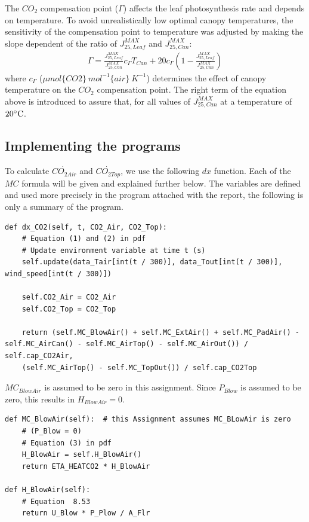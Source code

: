 \documentclass[a4paper]{article}
\numberwithin{equation}{section}
\begin{document}
The \(CO_2\) compensation point (\(\Gamma\)) affects the leaf photosynthesis rate and depends on temperature. To avoid unrealistically low optimal canopy temperatures, the sensitivity of the compensation point to temperature was adjusted by making the slope dependent of the ratio of \(J^{MAX}_{25,Leaf}\) and \(J^{MAX}_{25,Can}\):
\begin{align}
  \Gamma = \frac{J^{MAX}_{25,Leaf}}{J^{MAX}_{25,Can}}c_{\Gamma} T_{Can} + 20 c_{\Gamma} \left(1-\frac{J^{MAX}_{25,Leaf}}{J^{MAX}_{25,Can}}\right)
\end{align}
where \(c_{\Gamma}\) (\(\mu mol\{CO2\}\ mol^{-1}\{air\}\ K^{-1}\)) determines the effect of canopy temperature on the \(CO_2\) compensation point. The right term of the equation above is introduced to assure that, for all values of \(J^{MAX}_{25,Can}\) at a temperature of \(20 \celsius\).

\newpage
\subsection{Implementing the programs}
To calculate \(\dot{CO_{2 Air}}\) and \(\dot{CO_{2 Top}}\), we use the following \(dx\) function. Each of the \(MC\) formula will be given and explained further below. The variables are defined and used more precisely in the program attached with the report, the following is only a summary of the program.

\begin{mdframed}[leftline=false,rightline=false,backgroundcolor=magenta!10,nobreak=true]
  \begin{verbatim}
def dx_CO2(self, t, CO2_Air, CO2_Top):
    # Equation (1) and (2) in pdf
    # Update environment variable at time t (s)
    self.update(data_Tair[int(t / 300)], data_Tout[int(t / 300)], wind_speed[int(t / 300)])

    self.CO2_Air = CO2_Air
    self.CO2_Top = CO2_Top

    return (self.MC_BlowAir() + self.MC_ExtAir() + self.MC_PadAir() - self.MC_AirCan() - self.MC_AirTop() - self.MC_AirOut()) / self.cap_CO2Air, 
    (self.MC_AirTop() - self.MC_TopOut()) / self.cap_CO2Top
  \end{verbatim}
\end{mdframed}

\(MC_{BlowAir}\) is assumed to be zero in this assignment.
Since \(P_{Blow}\) is assumed to be zero, this results in \(H_{BlowAir} = 0\).
\begin{mdframed}[leftline=false,rightline=false,backgroundcolor=magenta!10,nobreak=true]
  \begin{verbatim}
def MC_BlowAir(self):  # this Assignment assumes MC_BLowAir is zero
    # (P_Blow = 0)
    # Equation (3) in pdf
    H_BlowAir = self.H_BlowAir()
    return ETA_HEATCO2 * H_BlowAir
    
def H_BlowAir(self):
    # Equation  8.53
    return U_Blow * P_Plow / A_Flr
  \end{verbatim}
\end{mdframed}
\end{document}
